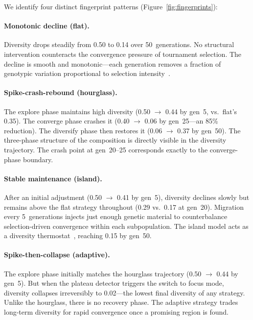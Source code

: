 \documentclass[dvipsnames,format=sigconf,anonymous=false,review=false]{acmart}
\begin{document}
We identify four distinct fingerprint patterns (Figure~\ref{fig:fingerprints}):

\paragraph{Monotonic decline (flat).}
Diversity drops steadily from 0.50 to 0.14 over 50~generations. No structural intervention counteracts the convergence pressure of tournament selection. The decline is smooth and monotonic---each generation removes a fraction of genotypic variation proportional to selection intensity~\cite{blickle1996comparison, crepinsek2013exploration}.

\paragraph{Spike-crash-rebound (hourglass).}
The explore phase maintains high diversity (0.50 $\to$ 0.44 by gen~5, vs.\ flat's 0.35). The converge phase crashes it (0.40 $\to$ 0.06 by gen~25---an 85\% reduction). The diversify phase then restores it (0.06 $\to$ 0.37 by gen~50). The three-phase structure of the composition is directly visible in the diversity trajectory. The crash point at gen~20--25 corresponds exactly to the converge-phase boundary.

\paragraph{Stable maintenance (island).}
After an initial adjustment (0.50 $\to$ 0.41 by gen~5), diversity declines slowly but remains above the flat strategy throughout (0.29 vs.\ 0.17 at gen~20). Migration every 5~generations injects just enough genetic material to counterbalance selection-driven convergence within each subpopulation. The island model acts as a diversity thermostat~\cite{whitley1999island}, reaching 0.15 by gen~50.

\paragraph{Spike-then-collapse (adaptive).}
The explore phase initially matches the hourglass trajectory (0.50 $\to$ 0.44 by gen~5). But when the plateau detector triggers the switch to focus mode, diversity collapses irreversibly to 0.02---the lowest final diversity of any strategy. Unlike the hourglass, there is no recovery phase. The adaptive strategy trades long-term diversity for rapid convergence once a promising region is found.
\end{document}
